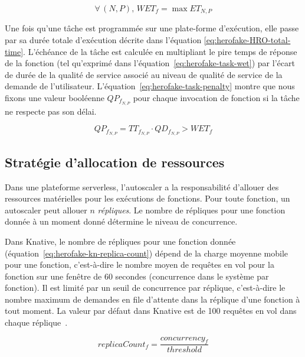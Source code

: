 \begin{equation}
    \forall \, (N, P), \, WET_{f} = \max ET_{N, P}
\label{eq:herofake-task-wet}
\end{equation}

Une fois qu'une tâche est programmée sur une plate-forme d'exécution, elle passe par sa durée totale d'exécution décrite dans l'équation \ref{eq:herofake-HRO-total-time}. L'échéance de la tâche est calculée en multipliant le pire temps de réponse de la fonction (tel qu'exprimé dans l'équation~\ref{eq:herofake-task-wet}) par l'écart de durée de la qualité de service associé au niveau de qualité de service de la demande de l'utilisateur. L'équation~\ref{eq:herofake-task-penalty} montre que nous fixons une valeur booléenne $QP_{f_{N, P}}$ pour chaque invocation de fonction si la tâche ne respecte pas son délai. 


\begin{equation}
    QP_{f_{N, P}} = TT_{f_{N, P}} \cdot QD_{f_{N, P}} > WET_{f}
\label{eq:herofake-task-penalty}
\end{equation}

\subsection{Stratégie d'allocation de ressources} \label{section:herofake-autoscaling-strategy}

Dans une plateforme serverless, l'autoscaler a la responsabilité d'allouer des ressources matérielles pour les exécutions de fonctions. Pour toute fonction, un autoscaler peut allouer $n$ \textit{répliques}. Le nombre de répliques pour une fonction donnée à un moment donné détermine le niveau de concurrence.

Dans Knative, le nombre de répliques pour une fonction donnée (équation~\ref{eq:herofake-kn-replica-count}) dépend de la charge moyenne mobile pour une fonction, c'est-à-dire le nombre moyen de requêtes en vol pour la fonction sur une fenêtre de 60 secondes (concurrence dans le système par fonction). Il est limité par un seuil de concurrence par réplique, c'est-à-dire le nombre maximum de demandes en file d'attente dans la réplique d'une fonction à tout moment. La valeur par défaut dans Knative est de 100 requêtes en vol dans chaque réplique~\cite{knative-autoscaling}.

\begin{equation}
    replicaCount_{f} = \frac{concurrency_{f}}{threshold}
\label{eq:herofake-kn-replica-count}
\end{equation}

